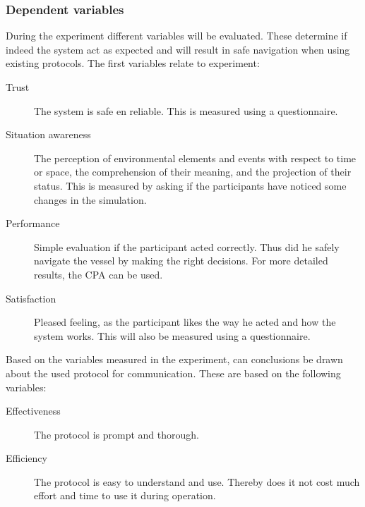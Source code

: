 \subsubsection{Dependent variables}
During the experiment different variables will be evaluated. These determine if indeed the system act as expected and will result in safe navigation when using existing protocols. The first variables relate to experiment:
\begin{description}
	\item [Trust] The system is safe en reliable. This is measured using a questionnaire.
	\item [Situation awareness] The perception of environmental elements and events with respect to time or space, the comprehension of their meaning, and the projection of their status. This is measured by asking if the participants have noticed some changes in the simulation.
	\item [Performance] Simple evaluation if the participant acted correctly. Thus did he safely navigate the vessel by making the right decisions. For more detailed results, the \acf{CPA} can be used.
	\item [Satisfaction] Pleased feeling, as the participant likes the way he acted and how the system works. This will also be measured using a questionnaire.
\end{description}

Based on the variables measured in the experiment, can conclusions be drawn about the used protocol for communication. These are based on the following variables:
\begin{description}
	\item [Effectiveness] The protocol is prompt and thorough.
	\item [Efficiency] The protocol is easy to understand and use. Thereby does it not cost much effort and time to use it during operation.
\end{description}


